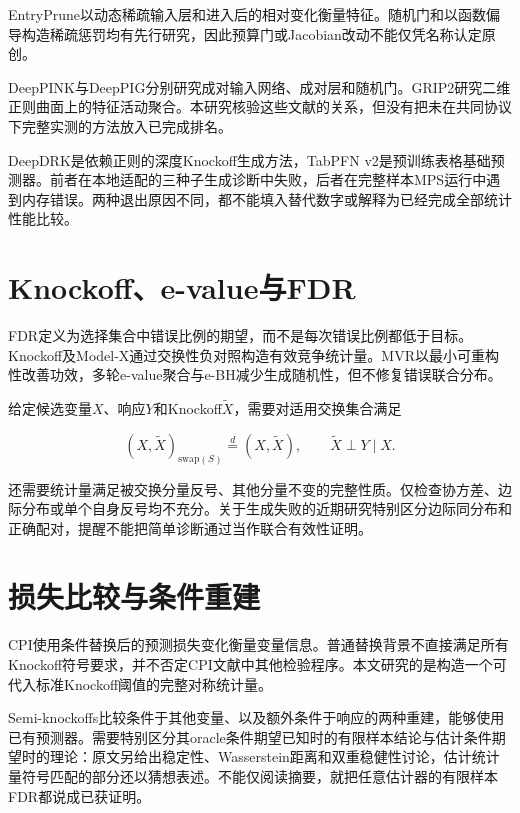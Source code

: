 \documentclass{sufethesismas}
\begin{document}
EntryPrune以动态稀疏输入层和进入后的相对变化衡量特征\cite{entryprune2025}。随机门和以函数偏导构造稀疏惩罚均有先行研究，因此预算门或Jacobian改动不能仅凭名称认定原创\cite{stg2020,snvs2018}。

DeepPINK与DeepPIG分别研究成对输入网络、成对层和随机门\cite{deeppink2018,deeppig2024}。GRIP2研究二维正则曲面上的特征活动聚合\cite{grip2026}。本研究核验这些文献的关系，但没有把未在共同协议下完整实测的方法放入已完成排名。

DeepDRK是依赖正则的深度Knockoff生成方法，TabPFN v2是预训练表格基础预测器\cite{deepdrk2024,tabpfn2025}。前者在本地适配的三种子生成诊断中失败，后者在完整样本MPS运行中遇到内存错误。两种退出原因不同，都不能填入替代数字或解释为已经完成全部统计性能比较。

\section{Knockoff、e-value与FDR}

FDR定义为选择集合中错误比例的期望，而不是每次错误比例都低于目标\cite{bh1995}。Knockoff及Model-X通过交换性负对照构造有效竞争统计量\cite{knockoff2015,modelx2018}。MVR以最小可重构性改善功效，多轮e-value聚合与e-BH减少生成随机性，但不修复错误联合分布\cite{mvr2022,derand2024,ebh2022}。

给定候选变量\(X\)、响应\(Y\)和Knockoff\(\widetilde X\)，需要对适用交换集合满足

\[
(X,\widetilde X)_{\mathrm{swap}(S)}\overset d=(X,\widetilde X),
\qquad \widetilde X\perp Y\mid X.
\]

还需要统计量满足被交换分量反号、其他分量不变的完整性质。仅检查协方差、边际分布或单个自身反号均不充分。关于生成失败的近期研究特别区分边际同分布和正确配对，提醒不能把简单诊断通过当作联合有效性证明\cite{knockofffail2025}。

\section{损失比较与条件重建}

CPI使用条件替换后的预测损失变化衡量变量信息\cite{cpi2021}。普通替换背景不直接满足所有Knockoff符号要求，并不否定CPI文献中其他检验程序。本文研究的是构造一个可代入标准Knockoff阈值的完整对称统计量。

Semi-knockoffs比较条件于其他变量、以及额外条件于响应的两种重建，能够使用已有预测器\cite{semiko2026}。需要特别区分其oracle条件期望已知时的有限样本结论与估计条件期望时的理论：原文另给出稳定性、Wasserstein距离和双重稳健性讨论，估计统计量符号匹配的部分还以猜想表述。不能仅阅读摘要，就把任意估计器的有限样本FDR都说成已获证明。
\end{document}
